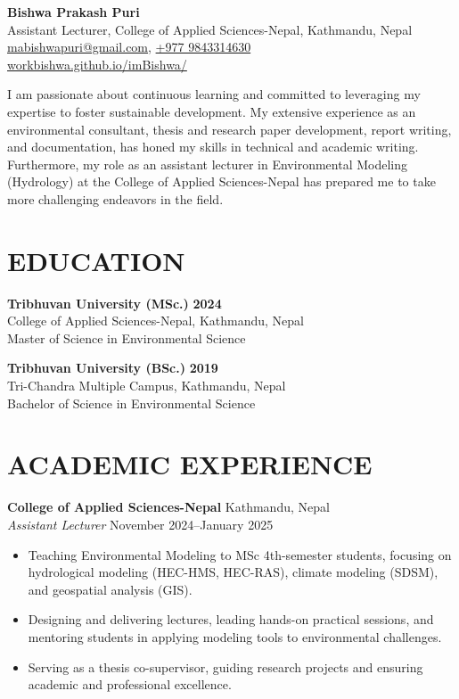 \documentclass[a4paper, 11pt]{extarticle}
\begin{document}
\begin{center}
\textbf{\huge Bishwa Prakash Puri}\\[4pt] 
Assistant Lecturer, College of Applied Sciences-Nepal, Kathmandu, Nepal\\
\href{mailto:mabishwapuri@gmail.com}{mabishwapuri@gmail.com}, 
\href{tel:+9779843314630}{+977 9843314630} \\
\href{https://workbishwa.github.io/imBishwa/}{workbishwa.github.io/imBishwa/}

\end{center}

I am passionate about continuous learning and committed to leveraging my expertise to foster sustainable development. My extensive experience as an environmental consultant, thesis and research paper development, report writing, and documentation, has honed my skills in technical and academic writing. Furthermore, my role as an assistant lecturer in Environmental Modeling (Hydrology) at the College of Applied Sciences-Nepal has prepared me to take more challenging endeavors in the field.


\section*{EDUCATION}

\textbf{Tribhuvan University (MSc.)} \hfill \textbf{2024}\\[2pt] 
College of Applied Sciences-Nepal, Kathmandu, Nepal\\
Master of Science in Environmental Science

\vspace{5pt}

\noindent
\textbf{Tribhuvan University (BSc.)} \hfill \textbf{2019}\\[2pt] 
Tri-Chandra Multiple Campus, Kathmandu, Nepal\\
Bachelor of Science in Environmental Science

\vspace{5pt}

\section*{ACADEMIC EXPERIENCE}
\noindent
\textbf{College of Applied Sciences-Nepal} \hfill Kathmandu, Nepal\\[2pt] 
\textit{Assistant Lecturer} \hfill November 2024--January 2025 
\begin{itemize}
    \item Teaching Environmental Modeling to MSc 4th-semester students, focusing on hydrological modeling (HEC-HMS, HEC-RAS), climate modeling (SDSM), and geospatial analysis (GIS).
    \item Designing and delivering lectures, leading hands-on practical sessions, and mentoring students in applying modeling tools to environmental challenges.
    \item Serving as a thesis co-supervisor, guiding research projects and ensuring academic and professional excellence.
\end{itemize}
\end{document}
